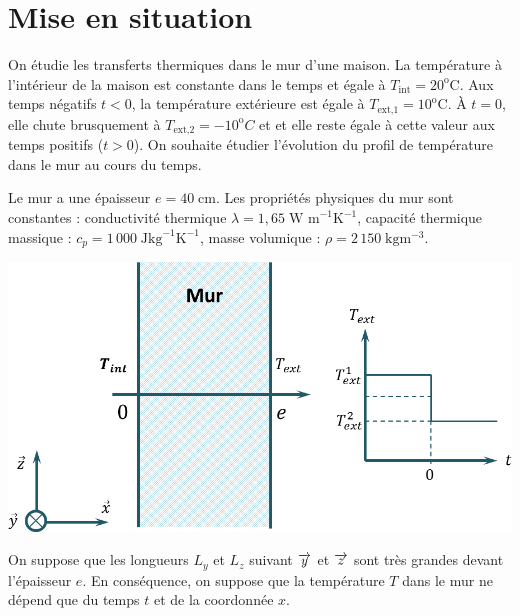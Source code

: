 \documentclass[10pt,fleqn]{article} %
\begin{document}

\vspace{1cm}
\pagestyle{fancy}
\thispagestyle{plain}

\section{Mise en situation}
\vspace{.25cm}

\noindent \begin{minipage}[c]{.6\linewidth}
 On étudie les transferts thermiques dans le mur d’une maison. La température à
l'intérieur de la maison est constante dans le temps et égale à $T_{\text{int}}=20^{\text{o}} \text{C}$. Aux temps négatifs $t<0$, la température extérieure est égale à $T_{\text{ext,1}}=10^{\text{o}} \text{C}$. À $t=0$, elle chute brusquement à $T_{\text{ext,2}}=-10^{\text{o}} C$ et et elle reste égale à cette valeur aux temps positifs ($t>0$). On
souhaite étudier l'évolution du profil de température dans le mur au cours du temps.

Le mur a une épaisseur $e=40\;\text{cm}$. Les propriétés physiques du mur sont constantes : conductivité thermique $\lambda = 1,65\; \text{W m}^{-1}\text{K}^{-1}$, capacité thermique massique : $c_p = 1\, 000\; \text{J}\text{kg}^{-1}\text{K}^{-1}$, masse volumique : $\rho = 2\, 150 \; \text{kg}\text{m}^{-3}$. 

\end{minipage} \hfill
\begin{minipage}[c]{.38\linewidth}
\begin{center}
\includegraphics[width=\linewidth]{images/figure_01}
\end{center}
\end{minipage}

On suppose que les longueurs $L_y$ et $L_z$ suivant $\overrightarrow{y}$ et $\overrightarrow{z}$ sont très grandes devant l'épaisseur $e$. En conséquence, on suppose que la température $T$ dans le mur ne dépend que du temps $t$ et de la coordonnée $x$. 
\end{document}
